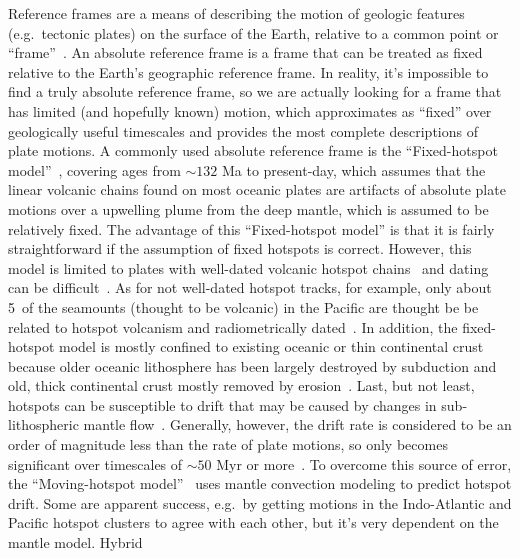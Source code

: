 Reference frames are a means of describing the motion of geologic features
(e.g.\ tectonic plates) on the surface of the Earth, relative to a common point
or ``frame''~\citep{Sh12}. An absolute reference frame is a frame that can be
treated as fixed relative to the Earth's geographic reference frame. In reality,
it's impossible to find a truly absolute reference frame, so we are actually
looking for a frame that has limited (and hopefully known) motion, which
approximates as ``fixed'' over geologically useful timescales and provides the
most complete descriptions of plate motions. A commonly used absolute reference
frame is the ``Fixed-hotspot model''~\citep{M93,M99}, covering ages from
${\sim}132$ Ma to present-day, which assumes that the linear volcanic chains
found on most oceanic plates are artifacts of absolute plate motions over a
upwelling plume from the deep mantle, which is assumed to be relatively fixed.
The advantage of this ``Fixed-hotspot model'' is that it is fairly
straightforward if the assumption of fixed hotspots is correct. However, this
model is limited to plates with well-dated volcanic hotspot chains~\citep[e.g.\
the Ninetyeast Ridge on the Indian Ocean floor and the Walvis Ridge in the
southern Atlantic Ocean, see][]{O05} and dating can be difficult~\citep[e.g.\
diffuse volcanic centers possibly related to large diameter plume conduits could
cause the existence of time reversals, see][]{O05}. As for not well-dated
hotspot tracks, for example, only about 5\textperthousand\ of the seamounts
(thought to be volcanic) in the Pacific are thought be be related to hotspot
volcanism and radiometrically dated~\citep[39 per cent of these ages are less
than 10 Ma, see][]{H07}. In addition, the fixed-hotspot model is mostly confined
to existing oceanic or thin continental crust because older oceanic lithosphere
has been largely destroyed by subduction and old, thick continental crust mostly
removed by erosion~\citep{C13}. Last, but not least, hotspots can be susceptible
to drift that may be caused by changes in sub-lithospheric mantle
flow~\citep{T09}. Generally, however, the drift rate is considered to be an
order of magnitude less than the rate of plate motions, so only becomes
significant over timescales of ${\sim}50$ Myr or more~\citep{O05,T07}. To
overcome this source of error, the ``Moving-hotspot model''~\citep{O05} uses
mantle convection modeling to predict hotspot drift. Some are apparent success,
e.g.\ by getting motions in the Indo-Atlantic and Pacific hotspot clusters to
agree with each other, but it's very dependent on the mantle model. Hybrid

